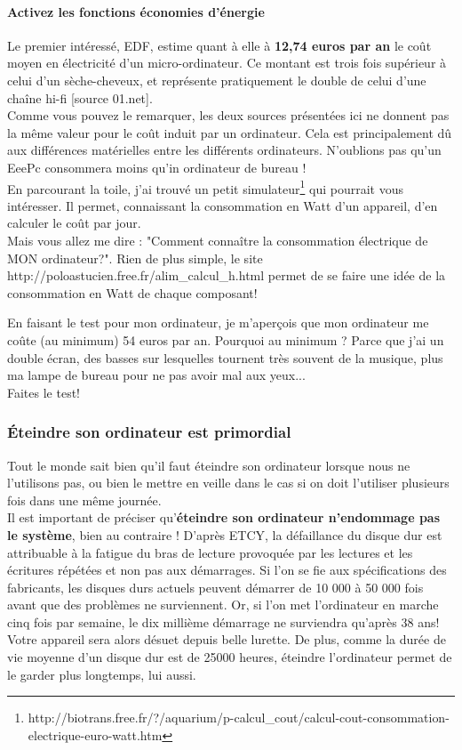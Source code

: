 \documentclass[a4paper,11pt,french]{report}
\begin{document}
\paragraph{Activez les fonctions \og économies d’énergie \fg}
Le premier intéressé, EDF, estime quant à elle à \textbf{12,74 euros par an} le coût moyen en électricité d'un micro-ordinateur. Ce montant est trois fois supérieur à celui d'un sèche-cheveux, et représente pratiquement le double de celui d'une chaîne hi-fi [source 01.net].\\

Comme vous pouvez le remarquer, les deux sources présentées ici ne donnent pas la même valeur pour le coût induit par un ordinateur. Cela est principalement dû aux différences matérielles entre les différents ordinateurs. N'oublions pas qu'un EeePc consommera moins qu'in ordinateur de bureau !\\

En parcourant la toile, j'ai trouvé un petit simulateur\footnote{\textsf{http://biotrans.free.fr/?/aquarium/p-calcul\_{}cout/calcul-cout-consommation-electrique-euro-watt.htm}} qui pourrait vous intéresser. Il permet, connaissant la consommation en Watt d'un appareil, d'en calculer le coût par jour.\\

Mais vous allez me dire : "Comment connaître la consommation électrique de MON ordinateur?". Rien de plus simple, le site \textsf{http://poloastucien.free.fr/alim\_{}calcul\_{}h.html} permet de se faire une idée de la consommation en Watt de chaque composant!

En faisant le test pour mon ordinateur, je m'aperçois que mon ordinateur me coûte (au minimum) 54 euros par an. Pourquoi au minimum ? Parce que j'ai un double écran, des basses sur lesquelles tournent très souvent de la musique, plus ma lampe de bureau pour ne pas avoir mal aux yeux...\\

Faites le test!

\subsubsection{\'Eteindre son ordinateur est primordial}
Tout le monde sait bien qu'il faut éteindre son ordinateur lorsque nous ne l'utilisons pas, ou bien le mettre en veille dans le cas si on doit l'utiliser plusieurs fois dans une même journée.\\
Il est important de préciser qu'\textbf{éteindre son ordinateur n'endommage pas le système}, bien au contraire ! D'après ETCY, la défaillance du disque dur est attribuable à la fatigue du bras de lecture provoquée par les lectures et les écritures répétées et non pas aux démarrages. Si l'on se fie aux spécifications des fabricants, les disques durs actuels peuvent démarrer de 10 000 à 50 000 fois avant que des problèmes ne surviennent. Or, si l'on met l'ordinateur en marche cinq fois par semaine, le dix millième démarrage ne surviendra qu'après 38 ans! Votre appareil sera alors désuet depuis belle lurette. De plus, comme la durée de vie moyenne d'un disque dur est de 25000 heures, éteindre l'ordinateur permet de le garder plus longtemps, lui aussi.\\
\end{document}
